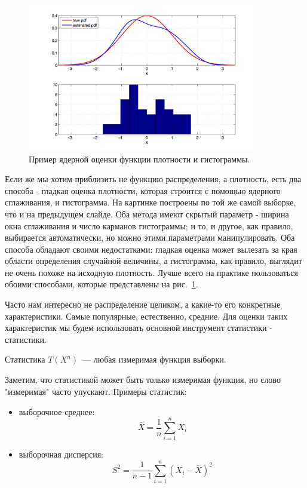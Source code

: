 \begin{figure}[!htb]\center
\includegraphics[width=0.9\textwidth]{lectures/lect1/src/epdf.png}
\caption{Пример ядерной оценки функции плотности и гистограммы.}
\label{fg:lect1:fig-6}
\end{figure}
Если же мы хотим приблизить не функцию распределения, а плотность, есть два способа - гладкая оценка плотности, которая строится с помощью ядерного сглаживания, и гистограмма. На картинке построены по той же самой выборке, что и на предыдущем слайде. Оба метода имеют скрытый параметр - ширина окна сглаживания и число карманов гистограммы; и то, и другое, как правило, выбирается автоматически, но можно этими параметрами манипулировать. Оба способа обладают своими недостатками: гладкая оценка может вылезать за края области определения случайной величины, а гистограмма, как правило, выглядит не очень похоже на исходную плотность. Лучше всего на практике пользоваться обоими способами, которые представлены на рис.~\ref{fg:lect1:fig-6}.

Часто нам интересно не распределение целиком, а какие-то его конкретные характеристики. Самые популярные, естественно, средние. Для оценки таких характеристик мы будем использовать основной инструмент статистики - статистики. 

\begin{definition}
    Статистика $T(X^n)$~--- любая измеримая функция выборки.
\end{definition}

Заметим, что статистикой может быть только измеримая функция, но слово "измеримая" часто упускают. Примеры статистик:
\begin{itemize}
    \item выборочное среднее:
    $$\bar{X} = \frac1{n}\sum\limits_{i=1}^n X_i$$
    \item выборочная дисперсия:
    $$S^2 = \frac1{n-1}\sum\limits_{i=1}^n \left(X_i-\bar{X}\right)^2$$
\end{itemize}

